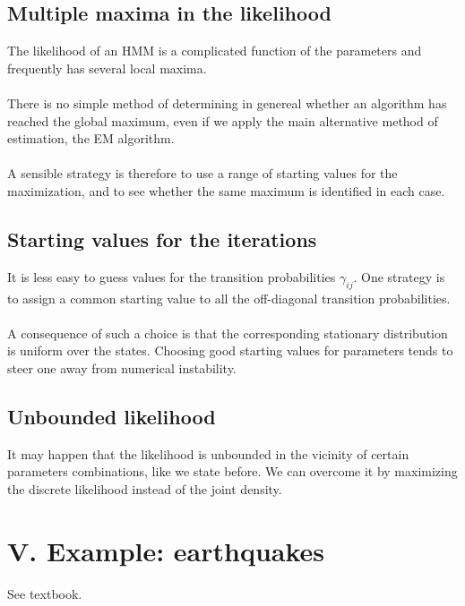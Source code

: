 \documentclass{article}
\begin{document}
\subsection*{Multiple maxima in the likelihood}
The likelihood of an HMM is a complicated function of the parameters and frequently has several local maxima. \\
\\
There is no simple method of determining in genereal whether an algorithm has reached the global maximum, even if we apply the main alternative method of estimation, the EM algorithm. \\
\\
A sensible strategy is therefore to use a range of starting values for the maximization, and to see whether the same maximum is identified in each case. 

\subsection*{Starting values for the iterations}
It is less easy to guess values for the transition probabilities $\gamma_{ij}$. One strategy is to assign a common starting value to all the off-diagonal transition probabilities. \\
\\
A consequence of such a choice is that the corresponding stationary distribution is uniform over the states. Choosing good starting values for parameters tends to steer one away from numerical instability. 

\subsection*{Unbounded likelihood}
It may happen that the likelihood is unbounded in the vicinity of certain parameters combinations, like we state before. We can overcome it by maximizing the discrete likelihood instead of the joint density. 

\section*{V. Example: earthquakes}

See textbook. 
\end{document}

